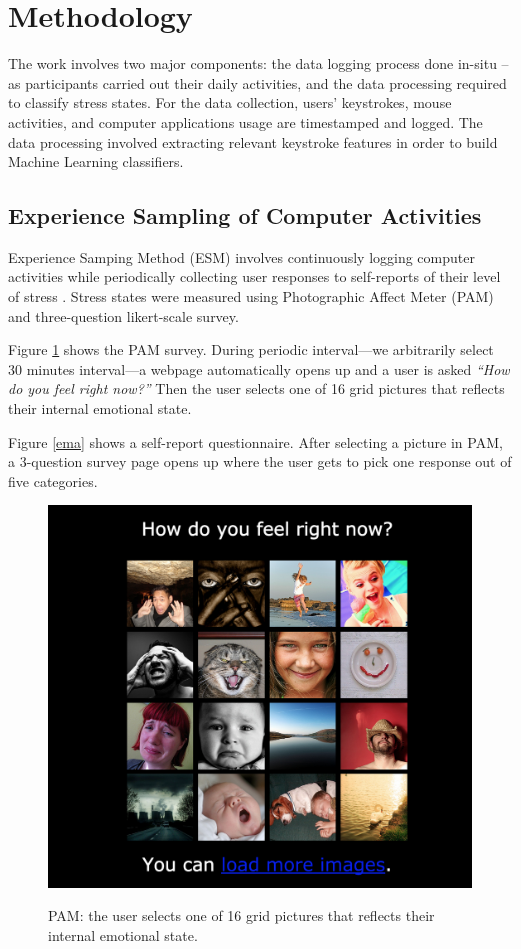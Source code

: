 \documentclass{article}
\begin{document}
\section{Methodology}
The work involves two major components: the data logging process done in-situ -- as participants carried out their daily activities, and the data processing required to classify stress states. For the data collection, users' keystrokes, mouse activities, and computer applications usage are timestamped and logged. The data processing involved extracting relevant keystroke features in order to build Machine Learning classifiers. 

\subsection{Experience Sampling of Computer Activities}
Experience Samping Method (ESM) involves continuously logging computer activities while periodically collecting user responses to self-reports of their level of stress \cite{hektner2007experience}. Stress states were measured using Photographic Affect Meter (PAM) \cite{pollak2011pam}and three-question likert-scale survey. 

Figure \ref{pam} shows the PAM survey. During periodic interval---we arbitrarily select 30 minutes interval---a webpage automatically opens up and a user is asked \textit{``How do you feel right now?''} Then the user selects one of 16 grid pictures that reflects their internal emotional state. 

Figure \ref{ema} shows a self-report questionnaire. After selecting a picture in PAM, a 3-question survey page opens up where the user gets to pick one response out of five categories. 

\begin{figure}[ht]
		\centering
		\includegraphics[width=\columnwidth]{pam}
		\label{pam}
		\caption{PAM: the user selects one of 16 grid pictures that reflects their internal emotional state.} 
		\label{pam}
\end{figure} 
\end{document}
